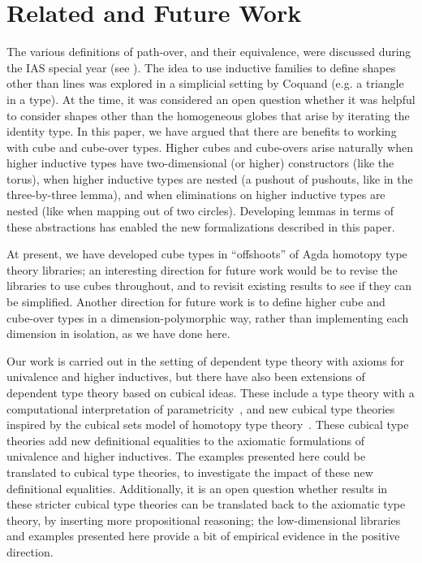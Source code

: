 \section{Related and Future Work}

The various definitions of path-over, and their equivalence, were
discussed during the IAS special year (see \citep[Remark
  6.3.2]{uf13hott-book}).  The idea to use inductive families to define
shapes other than lines was explored in a simplicial setting by Coquand
(e.g. a triangle in a type).  At the time, it was considered an open
question whether it was helpful to consider shapes other than the
homogeneous globes that arise by iterating the identity type.  In this
paper, we have argued that there are benefits to working with cube and
cube-over types.  Higher cubes and cube-overs arise naturally when
higher inductive types have two-dimensional (or higher) constructors
(like the torus), when higher inductive types are nested (a pushout of
pushouts, like in the three-by-three lemma), and when eliminations on
higher inductive types are nested (like when mapping out of two
circles).  Developing lemmas in terms of these abstractions has enabled
the new formalizations described in this paper.

At present, we have developed cube types in ``offshoots'' of Agda
homotopy type theory libraries; an interesting direction for future work
would be to revise the libraries to use cubes throughout, and to revisit
existing results to see if they can be simplified.  Another direction
for future work is to define higher cube and cube-over types in a
dimension-polymorphic way, rather than implementing each dimension in
isolation, as we have done here.

Our work is carried out in the setting of dependent type theory with
axioms for univalence and higher inductives, but there have also been
extensions of dependent type theory based on cubical ideas.  These
include a type theory with a computational interpretation of
parametricity~\citep{bernardy12parametricity}, and new cubical type
theories~\citep{coquand14variations,altenkirchkaposi14cubical,lb14cubes-oxford,polonsky14internalization}
inspired by the cubical sets model of homotopy type
theory~\citep{coquand+13cubical}.  These cubical type theories add new
definitional equalities to the axiomatic formulations of univalence and
higher inductives.  The examples presented here could be translated to
cubical type theories, to investigate the impact of these new
definitional equalities.  Additionally, it is an open question whether
results in these stricter cubical type theories can be translated back
to the axiomatic type theory, by inserting more propositional reasoning;
the low-dimensional libraries and examples presented here provide a bit
of empirical evidence in the positive direction.
